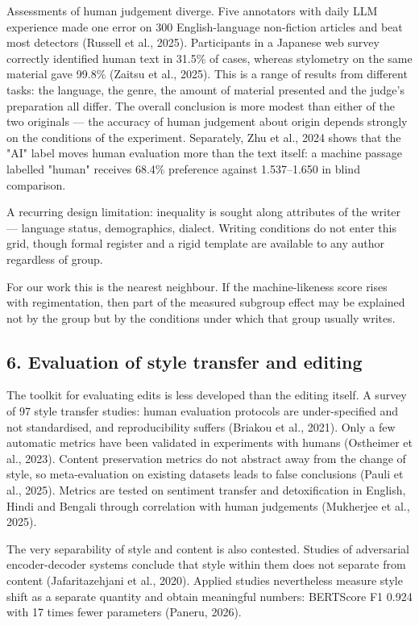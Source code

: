 \documentclass[11pt,a4paper]{article}
\renewcommand{\_}{\textunderscore\allowbreak}
\begin{document}
Assessments of human judgement diverge. Five annotators with daily
LLM experience made one error on 300 English-language non-fiction articles and beat most
detectors (Russell et al., 2025). Participants in a Japanese web survey correctly identified human
text in 31.5\% of cases, whereas stylometry on the same material gave 99.8\%
(Zaitsu et al., 2025). This is a range of results from different tasks: the language, the genre, the
amount of material presented and the judge's preparation all differ. The overall
conclusion is more modest than either of the two originals — the accuracy of
human judgement about origin depends strongly on the conditions of the
experiment. Separately, Zhu et al., 2024 shows that the "AI" label moves
human evaluation more than the text itself: a machine passage labelled
"human" receives 68.4\% preference against 1.537–1.650 in blind comparison.

A recurring design limitation: inequality is sought along attributes of the
writer — language status, demographics, dialect. Writing conditions do not
enter this grid, though formal register and a rigid template are available to
any author regardless of group.

For our work this is the nearest neighbour. If the machine-likeness score rises
with regimentation, then part of the measured subgroup effect may be explained
not by the group but by the conditions under which that group usually writes.

\subsection{6. Evaluation of style transfer and editing}

The toolkit for evaluating edits is less developed than the editing itself. A
survey of 97 style transfer studies: human evaluation protocols are
under-specified and not standardised, and reproducibility suffers (Briakou et al., 2021). Only a few automatic
metrics have been validated in experiments with humans (Ostheimer et al., 2023). Content preservation
metrics do not abstract away from the change of style, so meta-evaluation on
existing datasets leads to false conclusions (Pauli et al., 2025). Metrics are tested on sentiment
transfer and detoxification in English, Hindi and Bengali through
correlation with human judgements (Mukherjee et al., 2025).

The very separability of style and content is also contested. Studies of adversarial
encoder-decoder systems conclude that style within them does not separate from
content (Jafaritazehjani et al., 2020). Applied studies nevertheless measure style shift as a separate
quantity and obtain meaningful numbers: BERTScore F1 0.924 with 17 times fewer
parameters (Paneru, 2026).
\end{document}
